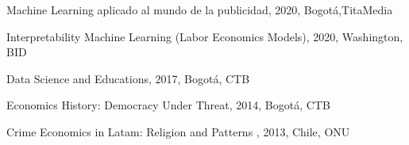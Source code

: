 
\begin{cventries}

\begin{cvitems}
\item {Machine Learning aplicado al mundo de la publicidad, 2020, Bogotá,TitaMedia}
\item {Interpretability Machine Learning (Labor Economics Models), 2020, Washington, BID}
\item {Data Science and Educations, 2017, Bogotá, CTB}
\item {Economics History: Democracy Under Threat, 2014, Bogotá, CTB}
\item {Crime Economics in Latam: Religion and Patterns , 2013, Chile, ONU}
\end{cvitems}

\end{cventries}
